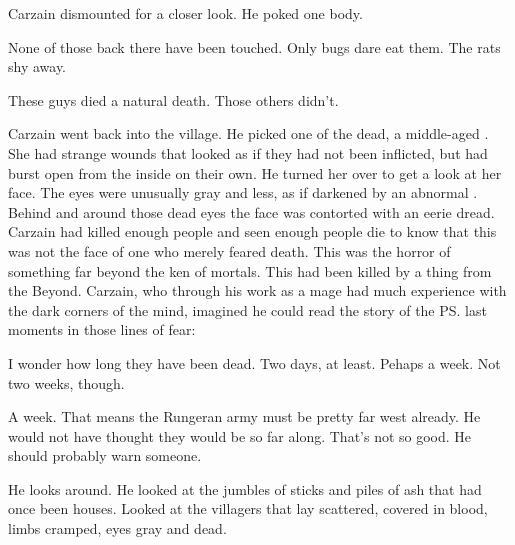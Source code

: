 Carzain dismounted for a closer look. 
He poked one body. 

None of those back there have been touched. 
Only bugs dare eat them. 
The rats shy away.

These guys died a natural death. 
Those others didn't.



Carzain went back into the village. 
He picked one of the  dead, a middle-aged \sphyle. 
She had strange wounds that looked as if they had not been inflicted, but had burst open from the inside on their own. 
He turned her over to get a look at her face. 
The eyes were unusually gray and \colour{}less, as if darkened by an abnormal . 
Behind and around those dead eyes the face was contorted with an eerie dread. 
Carzain had killed enough people and seen enough people die to know that this was not the face of one who merely feared death. 
This was the horror of something far beyond the ken of mortals. 
This \scatha{} had been killed by a thing from the Beyond. 
Carzain, who through his work as a mage had much experience with the dark corners of the mind, imagined he could read the story of the \ps{\sphyle} last moments in those lines of fear: 


I wonder how long they have been dead. 
Two days, at least. 
Pehaps a week.
Not two weeks, though. 

A week. 
That means the Rungeran army must be pretty far west already.
He would not have thought they would be so far along. 
That's not so good. 
He should probably warn someone. 
     
He looks around. 
He looked at the jumbles of sticks and piles of ash that had once been houses. 
Looked at the villagers that lay scattered, covered in blood, limbs cramped, eyes gray and dead. 
  

